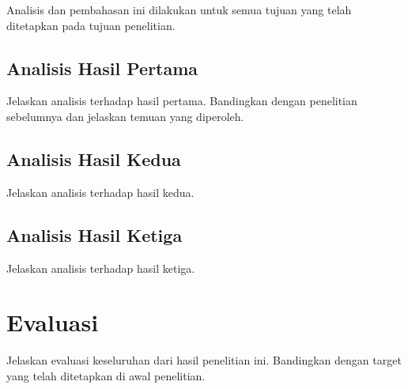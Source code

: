 Analisis dan pembahasan ini dilakukan untuk semua tujuan yang telah ditetapkan pada tujuan penelitian.

\subsection{Analisis Hasil Pertama}

Jelaskan analisis terhadap hasil pertama. Bandingkan dengan penelitian sebelumnya dan jelaskan temuan yang diperoleh.

\subsection{Analisis Hasil Kedua}

Jelaskan analisis terhadap hasil kedua.

\subsection{Analisis Hasil Ketiga}

Jelaskan analisis terhadap hasil ketiga.

\section{Evaluasi}

Jelaskan evaluasi keseluruhan dari hasil penelitian ini. Bandingkan dengan target yang telah ditetapkan di awal penelitian.
